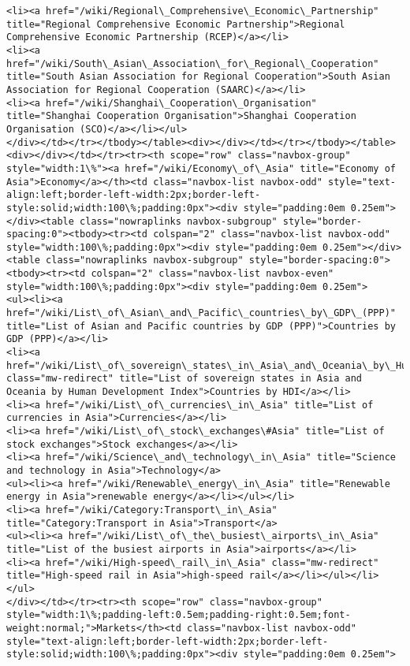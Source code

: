 \documentclass[11pt]{article}
\begin{document}
\begin{Verbatim}[commandchars=\\\{\}]
<li><a href="/wiki/Regional\_Comprehensive\_Economic\_Partnership" title="Regional Comprehensive Economic Partnership">Regional Comprehensive Economic Partnership (RCEP)</a></li>
<li><a href="/wiki/South\_Asian\_Association\_for\_Regional\_Cooperation" title="South Asian Association for Regional Cooperation">South Asian Association for Regional Cooperation (SAARC)</a></li>
<li><a href="/wiki/Shanghai\_Cooperation\_Organisation" title="Shanghai Cooperation Organisation">Shanghai Cooperation Organisation (SCO)</a></li></ul>
</div></td></tr></tbody></table><div></div></td></tr></tbody></table><div></div></td></tr><tr><th scope="row" class="navbox-group" style="width:1\%"><a href="/wiki/Economy\_of\_Asia" title="Economy of Asia">Economy</a></th><td class="navbox-list navbox-odd" style="text-align:left;border-left-width:2px;border-left-style:solid;width:100\%;padding:0px"><div style="padding:0em 0.25em"></div><table class="nowraplinks navbox-subgroup" style="border-spacing:0"><tbody><tr><td colspan="2" class="navbox-list navbox-odd" style="width:100\%;padding:0px"><div style="padding:0em 0.25em"></div><table class="nowraplinks navbox-subgroup" style="border-spacing:0"><tbody><tr><td colspan="2" class="navbox-list navbox-even" style="width:100\%;padding:0px"><div style="padding:0em 0.25em">
<ul><li><a href="/wiki/List\_of\_Asian\_and\_Pacific\_countries\_by\_GDP\_(PPP)" title="List of Asian and Pacific countries by GDP (PPP)">Countries by GDP (PPP)</a></li>
<li><a href="/wiki/List\_of\_sovereign\_states\_in\_Asia\_and\_Oceania\_by\_Human\_Development\_Index" class="mw-redirect" title="List of sovereign states in Asia and Oceania by Human Development Index">Countries by HDI</a></li>
<li><a href="/wiki/List\_of\_currencies\_in\_Asia" title="List of currencies in Asia">Currencies</a></li>
<li><a href="/wiki/List\_of\_stock\_exchanges\#Asia" title="List of stock exchanges">Stock exchanges</a></li>
<li><a href="/wiki/Science\_and\_technology\_in\_Asia" title="Science and technology in Asia">Technology</a>
<ul><li><a href="/wiki/Renewable\_energy\_in\_Asia" title="Renewable energy in Asia">renewable energy</a></li></ul></li>
<li><a href="/wiki/Category:Transport\_in\_Asia" title="Category:Transport in Asia">Transport</a>
<ul><li><a href="/wiki/List\_of\_the\_busiest\_airports\_in\_Asia" title="List of the busiest airports in Asia">airports</a></li>
<li><a href="/wiki/High-speed\_rail\_in\_Asia" class="mw-redirect" title="High-speed rail in Asia">high-speed rail</a></li></ul></li></ul>
</div></td></tr><tr><th scope="row" class="navbox-group" style="width:1\%;padding-left:0.5em;padding-right:0.5em;font-weight:normal;">Markets</th><td class="navbox-list navbox-odd" style="text-align:left;border-left-width:2px;border-left-style:solid;width:100\%;padding:0px"><div style="padding:0em 0.25em">

\end{Verbatim}
\end{document}
